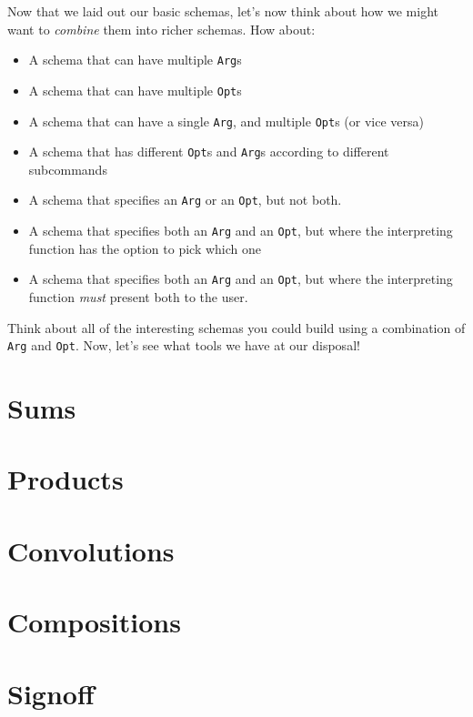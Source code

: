 \documentclass[]{article}
\begin{document}
Now that we laid out our basic schemas, let's now think about how we might want
to \emph{combine} them into richer schemas. How about:

\begin{itemize}
\tightlist
\item
  A schema that can have multiple \texttt{Arg}s
\item
  A schema that can have multiple \texttt{Opt}s
\item
  A schema that can have a single \texttt{Arg}, and multiple \texttt{Opt}s (or
  vice versa)
\item
  A schema that has different \texttt{Opt}s and \texttt{Arg}s according to
  different subcommands
\item
  A schema that specifies an \texttt{Arg} or an \texttt{Opt}, but not both.
\item
  A schema that specifies both an \texttt{Arg} and an \texttt{Opt}, but where
  the interpreting function has the option to pick which one
\item
  A schema that specifies both an \texttt{Arg} and an \texttt{Opt}, but where
  the interpreting function \emph{must} present both to the user.
\end{itemize}

Think about all of the interesting schemas you could build using a combination
of \texttt{Arg} and \texttt{Opt}. Now, let's see what tools we have at our
disposal!

\hypertarget{sums}{%
\section{Sums}\label{sums}}

\hypertarget{products}{%
\section{Products}\label{products}}

\hypertarget{convolutions}{%
\section{Convolutions}\label{convolutions}}

\hypertarget{compositions}{%
\section{Compositions}\label{compositions}}

\hypertarget{signoff}{%
\section{Signoff}\label{signoff}}
\end{document}
